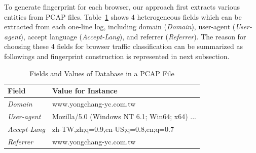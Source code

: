 
To generate fingerprint for each browser, our approach first extracts various entities from PCAP files. Table~\ref{tbl:log_01} shows 4 heterogeneous fields which can be extracted from each one-line log, including domain ({\em Domain}), user-agent ({\em User-agent}), accept language ({\em Accept-Lang}), and referrer ({\em Referrer}). The reason for choosing these 4 fields for browser traffic classification can be summarized as followings and fingerprint construction is represented in next subsection. 

\begin{table}[]
\centering
\caption{Fields and Values of Database in a PCAP File}
\label{tbl:log_01}
\begin{tabular}{ll}
\hline\hline
Field                           & Value for Instance                                               \\\hline
{\em Domain}            & www.yongchang-yc.com.tw                              \\
{\em User-agent}      & Mozilla/5.0 (Windows NT 6.1; Win64; x64) ...  \\
{\em Accept-Lang}   & zh-TW,zh;q=0.9,en-US;q=0.8,en;q=0.7          \\
{\em Referrer}           & www.yongchang-yc.com.tw                               \\\hline\hline
\end{tabular}
\end{table}

